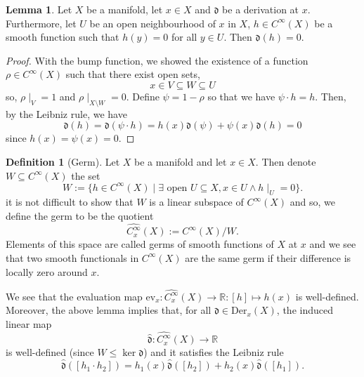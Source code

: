 \documentclass[]{article}
\theoremstyle{definition}
\theoremstyle{definition}
\newtheorem{definition}{Definition}[section]
\newtheorem{lemma}{Lemma}[section]
\begin{document}
\begin{lemma}
  Let \(X\) be a manifold, let \(x \in X\) and \(\mathfrak{d}\) be a derivation 
  at \(x\). Furthermore, let \(U\) be an open neighbourhood of \(x\) in \(X\), 
  \(h \in C^\infty(X)\) be a smooth function such that \(h(y) = 0\) for all 
  \(y \in U\). Then \(\mathfrak{d}(h) = 0\).
\end{lemma}
\begin{proof}
  With the bump function, we showed the existence of a function 
  \(\rho \in C^\infty(X)\) such that there exist open sets, 
  \[x \in V \subseteq W \subseteq U\]
  so, \(\rho\mid_V = 1\) and \(\rho\mid_{X \setminus W} = 0\). Define 
  \(\psi = 1 - \rho\) so that we have \(\psi \cdot h = h\). Then, by the 
  Leibniz rule, we have 
  \[\mathfrak{d}(h) = \mathfrak{d}(\psi \cdot h) = h(x)\mathfrak{d}(\psi) + 
    \psi(x)\mathfrak{d}(h) = 0\]
  since \(h(x) = \psi(x) = 0\).
\end{proof}

\begin{definition}[Germ]
  Let \(X\) be a manifold and let \(x \in X\). Then denote 
  \(W \subseteq C^\infty(X)\) the set
  \[W := \{h \in C^\infty(X) \mid \exists \text{ open } U \subseteq X, x \in U
    \wedge h\mid_U = 0\}.\]
  it is not difficult to show that \(W\) is a linear subspace of \(C^\infty(X)\) 
  and so, we define the germ to be the quotient
  \[\widehat{C_x^\infty}(X) := C^\infty(X) / W.\]
  Elements of this space are called germs of smooth functions of \(X\) at 
  \(x\) and we see that two smooth functionals in \(C^\infty(X)\) are the 
  same germ if their difference is locally zero around \(x\).
\end{definition}

We see that the evaluation map \(\text{ev}_x : \widehat{C_x^\infty}(X) \to 
\mathbb{R} : [h] \mapsto h(x)\) is well-defined. Moreover, the above lemma 
implies that, for all \(\mathfrak{d} \in \text{Der}_x(X)\), the induced linear map 
\[\hat{\mathfrak{d}} : \widehat{C_x^\infty}(X) \to \mathbb{R}\]
is well-defined (since \(W \le \ker \mathfrak{d}\)) and it satisfies the 
Leibniz rule 
\[\hat{\mathfrak{d}}([h_1 \cdot h_2]) = h_1(x)\hat{\mathfrak{d}}([h_2]) 
+ h_2(x)\hat{\mathfrak{d}}([h_1]).\]
\end{document}
